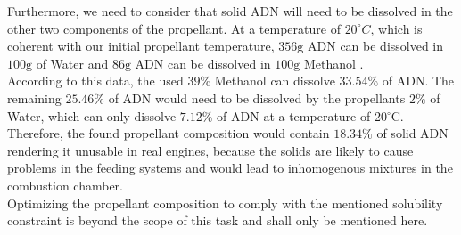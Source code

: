 \documentclass[12pt]{article}
\begin{document}
Furthermore, we need to consider that solid ADN will need to be dissolved in the other two components of the propellant. At a temperature of $20^\circ C$, which is coherent with our initial propellant temperature, $356\text{g}$ ADN can be dissolved in $100\text{g}$ of Water and $86\text{g}$ ADN can be dissolved in $100\text{g}$ Methanol \cite{Larsson2011}.\\

According to this data, the used $39\%$ Methanol can dissolve $33.54\%$ of ADN. The remaining $25.46\%$ of ADN would need to be dissolved by the propellants $2\%$ of Water, which can only dissolve $7.12\%$ of ADN at a temperature of 20$^\circ$C. Therefore, the found propellant composition would contain $18.34\%$ of solid ADN rendering it unusable in real engines, because the solids are likely to cause problems in the feeding systems and would lead to inhomogenous mixtures in the combustion chamber.\\

Optimizing the propellant composition to comply with the mentioned solubility constraint is beyond the scope of this task and shall only be mentioned here.

\end{document}
